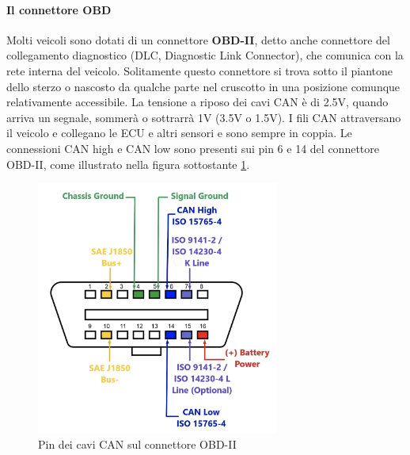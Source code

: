 \documentclass[12pt, a4paper, italian]{report}
\numberwithin{figure}{chapter}
\numberwithin{table}{chapter}
\begin{document}
\paragraph{Il connettore OBD} Molti veicoli sono dotati di un connettore \textbf{OBD-II}, detto anche connettore del collegamento diagnostico (DLC, Diagnostic Link Connector), che comunica con la rete interna del veicolo. Solitamente questo connettore si trova sotto il piantone dello sterzo o nascosto da qualche parte nel cruscotto in una posizione comunque relativamente accessibile.
La tensione a riposo dei cavi CAN è di 2.5V, quando arriva un segnale, sommerà o sottrarrà 1V (3.5V o 1.5V). I fili CAN attraversano il veicolo e collegano le ECU e altri sensori e sono sempre in coppia. Le connessioni CAN high e CAN low sono presenti sui pin 6 e 14 del connettore OBD-II, come illustrato nella figura sottostante \ref{fig:Connettore OBD}. \cite{manualeHacker}


\begin{figure}[h]
  \centering
  \includegraphics[width=8cm]{Connettore_OBD-II.png}
  \caption{Pin dei cavi CAN sul connettore OBD-II}
  \label{fig:Connettore OBD}
\end{figure}
\end{document}
